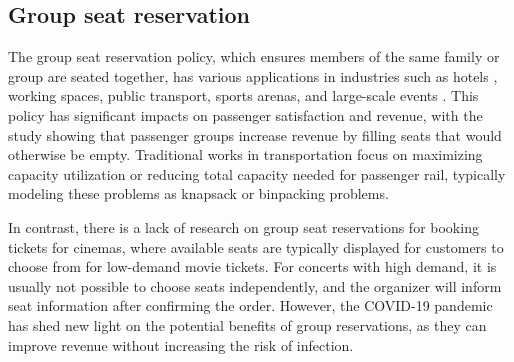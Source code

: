 


\subsection{Group seat reservation}
The group seat reservation policy, which ensures members of the same family or group are seated together, has various applications in industries such as hotels \cite{li2013modeling}, working spaces\cite{fischetti2021safe}, public transport\cite{deplano2019offline}, sports arenas\cite{kwag2022optimal}, and large-scale events \cite{lewis2016creating}. This policy has significant impacts on passenger satisfaction and revenue, with the study \cite{yuen2002group} showing that passenger groups increase revenue by filling seats that would otherwise be empty. Traditional works \cite{clausen2010off, deplano2019offline}in transportation focus on maximizing capacity utilization or reducing total capacity needed for passenger rail, typically modeling these problems as knapsack or binpacking problems.


In contrast, there is a lack of research on group seat reservations for booking tickets for cinemas, where available seats are typically displayed for customers to choose from for low-demand movie tickets. For concerts with high demand, it is usually not possible to choose seats independently, and the organizer will inform seat information after confirming the order. However, the COVID-19 pandemic has shed new light on the potential benefits of group reservations, as they can improve revenue without increasing the risk of infection.



